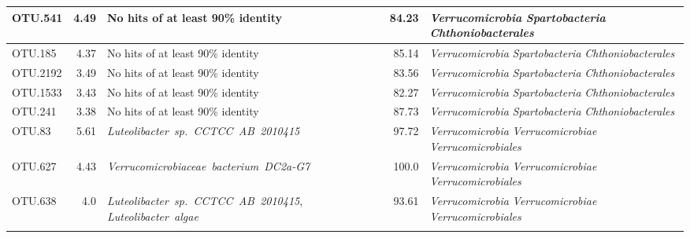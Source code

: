 \begin{longtable}{lrP{5cm}rP{7cm}}
OTU.541 & 4.49 & {No hits of at least 90\% identity} & 84.23 & \mbox{\textit{Verrucomicrobia}} \mbox{\textit{Spartobacteria}} \mbox{\textit{Chthoniobacterales}} \\ \midrule
OTU.185 & 4.37 & {No hits of at least 90\% identity} & 85.14 & \mbox{\textit{Verrucomicrobia}} \mbox{\textit{Spartobacteria}} \mbox{\textit{Chthoniobacterales}} \\ \midrule
OTU.2192 & 3.49 & {No hits of at least 90\% identity} & 83.56 & \mbox{\textit{Verrucomicrobia}} \mbox{\textit{Spartobacteria}} \mbox{\textit{Chthoniobacterales}} \\ \midrule
OTU.1533 & 3.43 & {No hits of at least 90\% identity} & 82.27 & \mbox{\textit{Verrucomicrobia}} \mbox{\textit{Spartobacteria}} \mbox{\textit{Chthoniobacterales}} \\ \midrule
OTU.241 & 3.38 & {No hits of at least 90\% identity} & 87.73 & \mbox{\textit{Verrucomicrobia}} \mbox{\textit{Spartobacteria}} \mbox{\textit{Chthoniobacterales}} \\ \midrule
OTU.83 & 5.61 & \mbox{\textit{Luteolibacter sp. CCTCC AB 2010415}} & 97.72 & \mbox{\textit{Verrucomicrobia}} \mbox{\textit{Verrucomicrobiae}} \mbox{\textit{Verrucomicrobiales}} \\ \midrule
OTU.627 & 4.43 & \mbox{\textit{Verrucomicrobiaceae bacterium DC2a-G7}} & 100.0 & \mbox{\textit{Verrucomicrobia}} \mbox{\textit{Verrucomicrobiae}} \mbox{\textit{Verrucomicrobiales}} \\ \midrule
OTU.638 & 4.0 & \mbox{\textit{Luteolibacter sp. CCTCC AB 2010415}}, \mbox{\textit{Luteolibacter algae}} & 93.61 & \mbox{\textit{Verrucomicrobia}} \mbox{\textit{Verrucomicrobiae}} \mbox{\textit{Verrucomicrobiales}} \\ \midrule

\bottomrule
\label{tab:cell}
\end{longtable}
